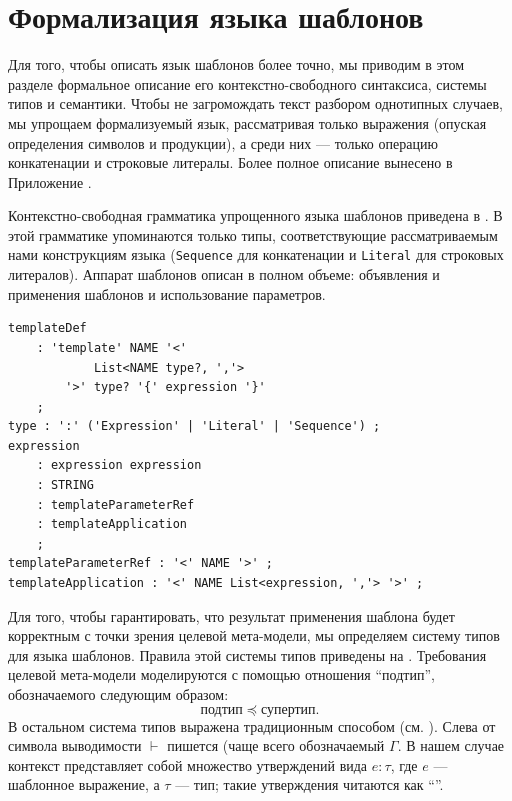 \section{Формализация языка шаблонов}

Для того, чтобы описать язык шаблонов более точно, мы приводим в этом разделе формальное описание его контекстно-свободного синтаксиса, системы типов и семантики. Чтобы не загромождать текст разбором однотипных случаев, мы упрощаем формализуемый язык, рассматривая только выражения (опуская определения символов и продукции), а среди них --- только операцию конкатенации и строковые литералы. Более полное описание вынесено в Приложение .

Контекстно-свободная грамматика упрощенного языка шаблонов приведена в . В этой грамматике упоминаются только типы, соответствующие рассматриваемым нами конструкциям языка (\texttt{Sequence} для конкатенации и \texttt{Literal} для строковых литералов). Аппарат шаблонов описан в полном объеме: объявления и применения шаблонов и использование параметров.

\begin{lstlisting}[float=htbp,label=TempG,caption=Грамматика упрощенного языка шаблонов]
templateDef
	: 'template' NAME '<' 
			List<NAME type?, ','> 
	  	'>' type? '{' expression '}'
	;
type : ':' ('Expression' | 'Literal' | 'Sequence') ;
expression
	: expression expression
	: STRING
	: templateParameterRef
	: templateApplication
	;
templateParameterRef : '<' NAME '>'	;
templateApplication	: '<' NAME List<expression, ','> '>' ;
\end{lstlisting}

Для того, чтобы гарантировать, что результат применения шаблона будет корректным с точки зрения целевой мета-модели, мы определяем систему типов для языка шаблонов. Правила этой системы типов приведены на . Требования целевой мета-модели моделируются с помощью отношения ``подтип'', обозначаемого следующим образом:
$$
	\mbox{подтип} \preceq \mbox{супертип}.
$$
В остальном система типов выражена традиционным способом (см. \cite{???}). Слева от символа выводимости $\vdash$ пишется  (чаще всего обозначаемый $\Gamma$. В нашем случае контекст представляет собой множество утверждений вида $e : \tau$, где $e$ --- шаблонное выражение, а $\tau$ --- тип; такие утверждения читаются как ``''. 

